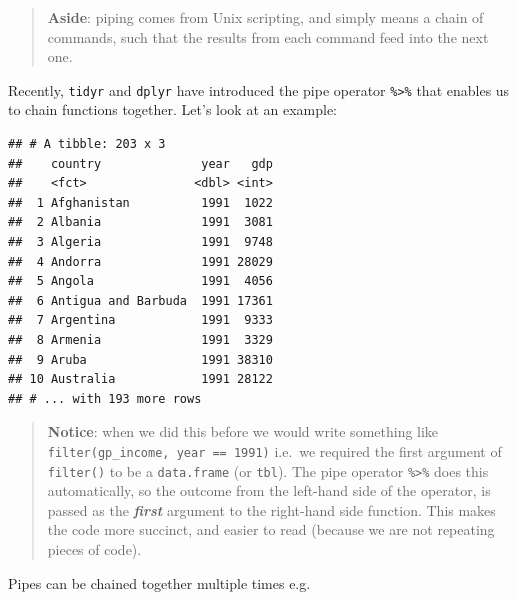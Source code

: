 \documentclass[]{book}
\newenvironment{Shaded}{\begin{snugshade}}{\end{snugshade}}
\newcommand{\KeywordTok}[1]{\textcolor[rgb]{0.13,0.29,0.53}{\textbf{{#1}}}}
\newcommand{\DecValTok}[1]{\textcolor[rgb]{0.00,0.00,0.81}{{#1}}}
\newcommand{\StringTok}[1]{\textcolor[rgb]{0.31,0.60,0.02}{{#1}}}
\newcommand{\NormalTok}[1]{{#1}}
\theoremstyle{definition}
\theoremstyle{definition}
\theoremstyle{definition}
\theoremstyle{remark}
\begin{document}
\begin{quote}
\textbf{Aside}: piping comes from Unix scripting, and simply means a
chain of commands, such that the results from each command feed into the
next one.
\end{quote}

Recently, \texttt{tidyr} and \texttt{dplyr} have introduced the pipe
operator \texttt{\%\textgreater{}\%} that enables us to chain functions
together. Let's look at an example:

\begin{Shaded}
\end{Shaded}

\begin{verbatim}
## # A tibble: 203 x 3
##    country              year   gdp
##    <fct>               <dbl> <int>
##  1 Afghanistan          1991  1022
##  2 Albania              1991  3081
##  3 Algeria              1991  9748
##  4 Andorra              1991 28029
##  5 Angola               1991  4056
##  6 Antigua and Barbuda  1991 17361
##  7 Argentina            1991  9333
##  8 Armenia              1991  3329
##  9 Aruba                1991 38310
## 10 Australia            1991 28122
## # ... with 193 more rows
\end{verbatim}

\begin{quote}
\textbf{Notice}: when we did this before we would write something like
\texttt{filter(gp\_income,\ year\ ==\ 1991)} i.e.~we required the first
argument of \texttt{filter()} to be a \texttt{data.frame} (or
\texttt{tbl}). The pipe operator \texttt{\%\textgreater{}\%} does this
automatically, so the outcome from the left-hand side of the operator,
is passed as the \textbf{\emph{first}} argument to the right-hand side
function. This makes the code more succinct, and easier to read (because
we are not repeating pieces of code).
\end{quote}

Pipes can be chained together multiple times e.g.

\begin{Shaded}
\end{Shaded}
\end{document}
